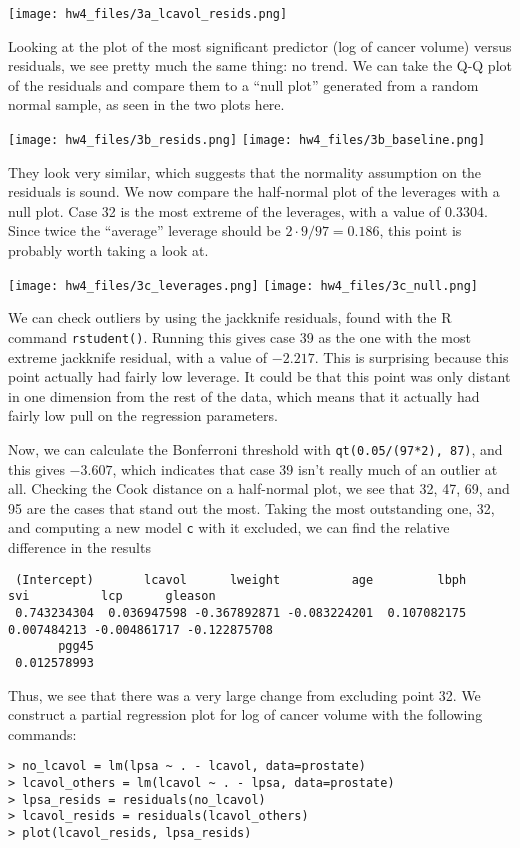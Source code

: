 \documentclass{article}
\begin{document}
\noindent\texttt{[image: hw4\_files/3a\_lcavol\_resids.png]}

Looking at the plot of the most significant predictor (log of cancer volume) versus residuals, we see pretty much the same thing: no trend.
We can take the Q-Q plot of the residuals and compare them to a ``null plot'' generated from a random normal sample, as seen in the two plots here.

\noindent\texttt{[image: hw4\_files/3b\_resids.png]}
\texttt{[image: hw4\_files/3b\_baseline.png]}

They look very similar, which suggests that the normality assumption on the residuals is sound.
We now compare the half-normal plot of the leverages with a null plot. Case 32 is the most extreme of the leverages, with a value of $0.3304$. Since twice the ``average'' leverage should be $2\cdot9/97=0.186$, this point is probably worth taking a look at.

\noindent\texttt{[image: hw4\_files/3c\_leverages.png]}
\texttt{[image: hw4\_files/3c\_null.png]}

We can check outliers by using the jackknife residuals, found with the R command \verb|rstudent()|. Running this gives case 39 as the one with the most extreme jackknife residual, with a value of $-2.217$. This is surprising because this point actually had fairly low leverage. It could be that this point was only distant in one dimension from the rest of the data, which means that it actually had fairly low pull on the regression parameters. 

Now, we can calculate the Bonferroni threshold with \verb|qt(0.05/(97*2), 87)|, and this gives $-3.607$, which indicates that case 39 isn't really much of an outlier at all.
Checking the Cook distance on a half-normal plot, we see that 32, 47, 69, and 95 are the cases that stand out the most. Taking the most outstanding one, 32, and computing a new model \verb|c| with it excluded, we can find the relative difference in the results
\begin{verbatim}
 (Intercept)       lcavol      lweight          age         lbph          svi          lcp      gleason 
 0.743234304  0.036947598 -0.367892871 -0.083224201  0.107082175  0.007484213 -0.004861717 -0.122875708 
       pgg45 
 0.012578993
\end{verbatim}
Thus, we see that there was a very large change from excluding point 32.
We construct a partial regression plot for log of cancer volume with the following commands:
\begin{verbatim}
> no_lcavol = lm(lpsa ~ . - lcavol, data=prostate)
> lcavol_others = lm(lcavol ~ . - lpsa, data=prostate)
> lpsa_resids = residuals(no_lcavol)
> lcavol_resids = residuals(lcavol_others)
> plot(lcavol_resids, lpsa_resids)
\end{verbatim}
\end{document}
